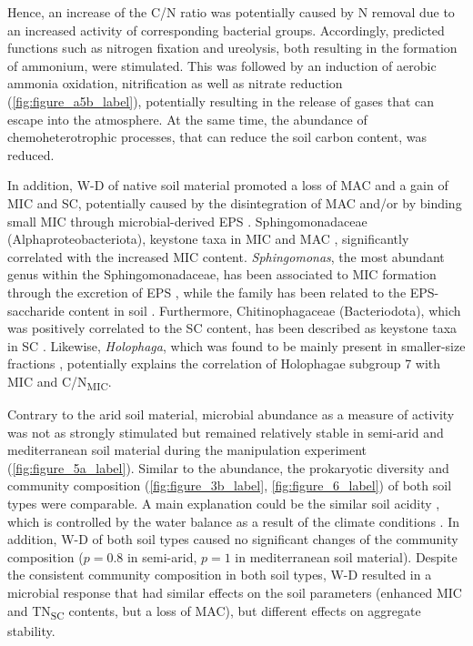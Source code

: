 Hence, an increase of the C/N ratio was potentially caused by N removal due to an increased activity of corresponding bacterial groups. 
Accordingly, predicted functions such as nitrogen fixation and ureolysis, both resulting in the formation of ammonium, were stimulated. 
This was followed by an induction of aerobic ammonia oxidation, nitrification as well as nitrate reduction (\cref{fig:figure_a5b_label}), potentially resulting in the release of gases that can escape into the atmosphere. 
At the same time, the abundance of chemoheterotrophic processes, that can reduce the soil carbon content, was reduced.

In addition, W-D of native soil material promoted a loss of MAC and a gain of MIC and SC, potentially caused by the disintegration of MAC and/or by binding small MIC through microbial-derived EPS \citep{Six2004, Totsche2018}. 
Sphingomonadaceae (Alphaproteobacteriota), keystone taxa in MIC and MAC \citep{Feng2022}, significantly correlated with the increased MIC content. 
\textit{Sphingomonas}, the most abundant genus within the Sphingomonadaceae, has been associated to MIC formation through the excretion of EPS \citep{Pankratov2007, Vuko2020}, while the family has been related to the EPS-saccharide content in soil \citep{Bettermann2021}. 
Furthermore, Chitinophagaceae (Bacteriodota), which was positively correlated to the SC content, has been described as keystone taxa in SC \citep{Feng2022}. 
Likewise, \textit{Holophaga}, which was found to be mainly present in smaller-size fractions \citep{Sessitsch2001}, potentially explains the correlation of Holophagae subgroup 7 with MIC and C/N\textsubscript{MIC}.

Contrary to the arid soil material, microbial abundance as a measure of activity was not as strongly stimulated but remained relatively stable in semi-arid and mediterranean soil material during the manipulation experiment (\cref{fig:figure_5a_label}). 
Similar to the abundance, the prokaryotic diversity and community composition (\cref{fig:figure_3b_label}, \cref{fig:figure_6_label}) of both soil types were comparable. 
A main explanation could be the similar soil acidity \citep{Bernhard2018b}, which is controlled by the water balance as a result of the climate conditions \citep{Slessarev2016}. 
In addition, W-D of both soil types caused no significant changes of the community composition (\(p = 0.8\) in semi-arid, \(p = 1\) in mediterranean soil material). 
Despite the consistent community composition in both soil types, W-D resulted in a microbial response that had similar effects on the soil parameters (enhanced MIC and TN\textsubscript{SC} contents, but a loss of MAC), but different effects on aggregate stability.

